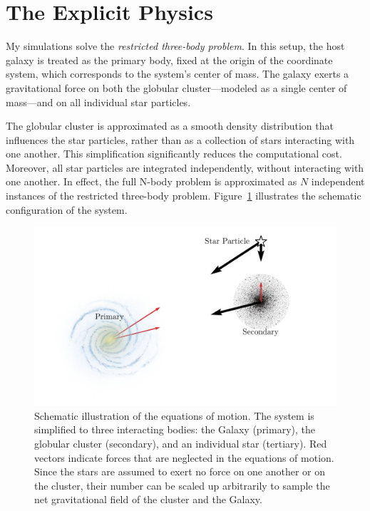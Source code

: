 \section{The Explicit Physics}
    My simulations solve the \textit{restricted three-body problem}. In this setup, the host galaxy is treated as the primary body, fixed at the origin of the coordinate system, which corresponds to the system's center of mass. The galaxy exerts a gravitational force on both the globular cluster—modeled as a single center of mass—and on all individual star particles.

    The globular cluster is approximated as a smooth density distribution that influences the star particles, rather than as a collection of stars interacting with one another. This simplification significantly reduces the computational cost. Moreover, all star particles are integrated independently, without interacting with one another. In effect, the full N-body problem is approximated as \(N\) independent instances of the restricted three-body problem.  Figure~\ref{fig:restricted_three_body_set_up} illustrates the schematic configuration of the system.
    \begin{figure}
        \centering
        \includegraphics[width=\linewidth]{images/restricted_three_body_set_up.png}
        \caption{Schematic illustration of the equations of motion. The system is simplified to three interacting bodies: the Galaxy (primary), the globular cluster (secondary), and an individual star (tertiary). Red vectors indicate forces that are neglected in the equations of motion. Since the stars are assumed to exert no force on one another or on the cluster, their number can be scaled up arbitrarily to sample the net gravitational field of the cluster and the Galaxy.}
        \label{fig:restricted_three_body_set_up}
    \end{figure}
    
